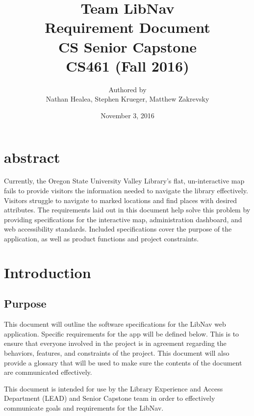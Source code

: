 \documentclass[letterpaper,10pt,titlepage, onecolumn, compsoc]{IEEEtran}
\title{Team LibNav \\ Requirement Document \\ CS Senior Capstone \\ \vspace{2mm}\small CS461 (Fall 2016)}
\author{Authored by \\ Nathan Healea, Stephen Krueger, Matthew Zakrevsky}
\date{November 3, 2016}
\begin{document}
\maketitle

\section*{abstract}
Currently, the Oregon State University Valley Library's flat, un-interactive map fails to provide visitors the information needed to navigate the library effectively. Visitors struggle to navigate to marked locations and find places with desired attributes. The requirements laid out in this document help solve this problem by providing specifications for the interactive map, administration dashboard, and web accessibility standards. Included specifications cover the purpose of the application, as well as product functions and project constraints.

\newpage

\section{Introduction}

\subsection{Purpose}

This document will outline the software specifications for the LibNav web application. Specific requirements for the app will be defined below. This is to ensure that everyone involved in the project is in agreement regarding the behaviors, features, and constraints of the project. This document will also provide a glossary that will be used to make sure the contents of the document are communicated effectively.  

This document is intended for use by the  Library Experience and Access Department (LEAD) and Senior Capstone team in order to effectively communicate goals and requirements for the LibNav. 
\end{document}
